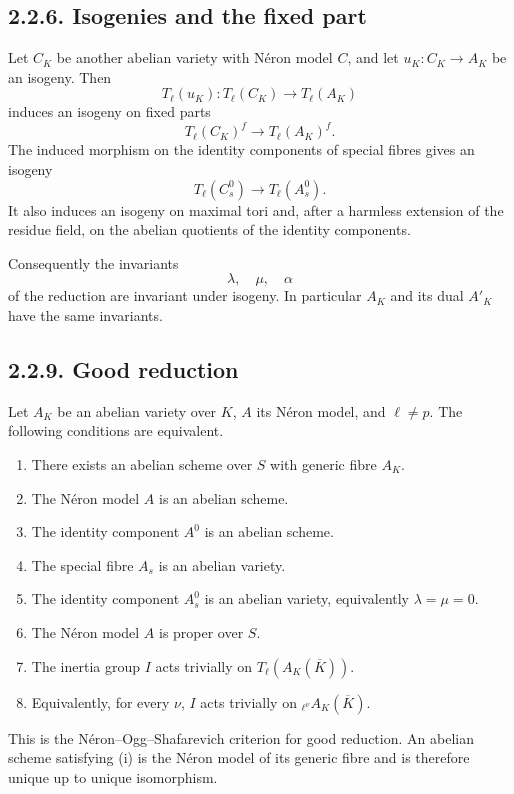 \documentclass[11pt]{article}
\begin{document}
\subsection*{2.2.6. Isogenies and the fixed part}

Let \(C_K\) be another abelian variety with Néron model \(C\), and let
\(u_K:C_K\to A_K\) be an isogeny. Then
\[
T_\ell(u_K):T_\ell(C_K)\to T_\ell(A_K)
\]
induces an isogeny on fixed parts
\[
T_\ell(C_K)^f\longrightarrow T_\ell(A_K)^f.
\]
The induced morphism on the identity components of special fibres gives an
isogeny
\[
T_\ell(C_s^0)\longrightarrow T_\ell(A_s^0).
\]
It also induces an isogeny on maximal tori and, after a harmless extension of
the residue field, on the abelian quotients of the identity components.

Consequently the invariants
\[
\lambda,\quad \mu,\quad \alpha
\]
of the reduction are invariant under isogeny. In particular \(A_K\) and its dual
\(A'_K\) have the same invariants.

\subsection*{2.2.9. Good reduction}

Let \(A_K\) be an abelian variety over \(K\), \(A\) its Néron model, and
\(\ell\neq p\). The following conditions are equivalent.

\begin{enumerate}[label=(\roman*)]
\item There exists an abelian scheme over \(S\) with generic fibre \(A_K\).
\item The Néron model \(A\) is an abelian scheme.
\item The identity component \(A^0\) is an abelian scheme.
\item The special fibre \(A_s\) is an abelian variety.
\item The identity component \(A_s^0\) is an abelian variety, equivalently
\(\lambda=\mu=0\).
\item The Néron model \(A\) is proper over \(S\).
\item The inertia group \(I\) acts trivially on
\(T_\ell(A_K(\overline K))\).
\item Equivalently, for every \(\nu\), \(I\) acts trivially on
\({}_{\ell^\nu}A_K(\overline K)\).
\end{enumerate}

This is the Néron--Ogg--Shafarevich criterion for good reduction. An abelian
scheme satisfying (i) is the Néron model of its generic fibre and is therefore
unique up to unique isomorphism.
\end{document}

